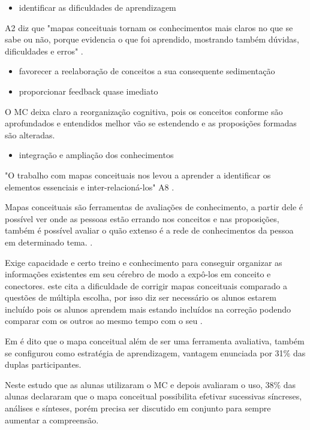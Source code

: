 \begin{itemize}
\item[]identificar as dificuldades de aprendizagem
\end{itemize}
A2 diz que "mapas conceituais tornam os conhecimentos mais claros no que se sabe ou não, porque evidencia o que foi aprendido, mostrando também dúvidas, dificuldades e erros" \cite{vantagensDesvantagensMC}.


\begin{itemize}
\item[]favorecer a reelaboração de conceitos a sua consequente sedimentação
\item[]proporcionar feedback quase imediato
\end{itemize}

O MC deixa claro a reorganização cognitiva, pois os conceitos conforme são aprofundados e entendidos melhor vão se estendendo e as proposições formadas são alteradas.\cite{vantagensDesvantagensMC}


\begin{itemize}
\item[]integração e ampliação dos conhecimentos
\end{itemize}
"O trabalho com mapas conceituais nos levou a aprender a identificar os elementos essenciais e inter-relacioná-los" A8 \cite{vantagensDesvantagensMC}.



Mapas conceituais são ferramentas de avaliações de conhecimento, a partir dele é possível ver onde as pessoas estão errando nos conceitos e nas proposições, também é possível avaliar o quão extenso é a rede de conhecimentos da pessoa em determinado tema. \cite{vantagensDesvantagensMC}.

Exige capacidade e certo treino e conhecimento para conseguir organizar as informações existentes em seu cérebro de modo a expô-los em conceito e conectores.
este cita a dificuldade de corrigir mapas conceituais comparado a questões de múltipla escolha, por isso diz ser necessário os alunos estarem incluído pois os alunos aprendem mais estando incluídos na correção podendo comparar com os outros ao mesmo tempo com o seu \cite{dificuldadesMapaConceitual}.


Em \cite{vantagensDesvantagensMC} é dito que o mapa conceitual além de ser uma ferramenta avaliativa, também se configurou como estratégia de aprendizagem, vantagem enunciada por 31\% das duplas participantes.

Neste estudo \cite{vantagensDesvantagensMC} que as alunas utilizaram o MC e depois avaliaram o uso, 38\% das alunas declararam que o mapa conceitual possibilita efetivar sucessivas síncreses, análises e sínteses, porém precisa ser discutido em conjunto para sempre aumentar a compreensão.


